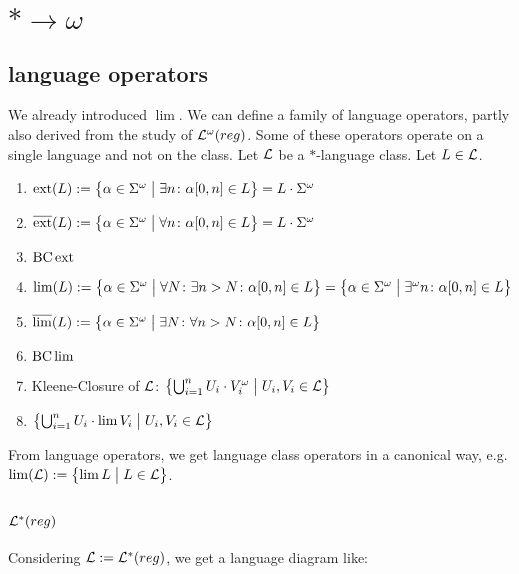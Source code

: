 \section{$* \rightarrow \omega$}

\subsection{ language operators}

We already introduced $\lim$. We can define a family of language operators, partly also derived from the study of $\mathcal{L}^\omega(reg)$. Some of these operators operate on a single language and not on the class. Let $\mathcal{L}$ be a $*$-language class. Let $L \in \mathcal{L}$.

\begin{enumerate}
\item $\ext(L) := \Set{\alpha \in \Sigma^\omega}{ \exists n \colon \alpha[0,n] \in L} = L \cdot \Sigma^\omega$
\item $\dext(L) := \Set{\alpha \in \Sigma^\omega}{ \forall n \colon \alpha[0,n] \in L} = L \cdot \Sigma^\omega$
\item $\operatorname{BC} \operatorname{ext}$
\item $\lim(L) := \Set{ \alpha \in \Sigma^\omega }{ \forall N \colon \exists n > N \colon \alpha[0,n] \in L } = \Set{ \alpha \in \Sigma^\omega }{ \exists^\omega n \colon \alpha[0,n] \in L }$
\item $\dlim(L) := \Set{ \alpha \in \Sigma^\omega }{ \exists N \colon \forall n > N \colon \alpha[0,n] \in L }$
\item $\operatorname{BC} \lim$
\item Kleene-Closure of $\mathcal{L}$: $\Set{ \bigcup_{i=1}^n U_i \cdot V_i^\omega}{U_i, V_i \in \Lang}$
\item $\Set{\bigcup_{i=1}^n U_i \cdot \lim V_i}{U_i, V_i \in \Lang}$
\end{enumerate}

From language operators, we get language class operators in a canonical way, e.g. $\lim(\Lang) := \Set{\lim L}{L \in \Lang}$.

\subsection{$\mathcal{L}^*(reg)$}

Considering $\mathcal{L} := \mathcal{L}^*(reg)$, we get a language diagram like:

